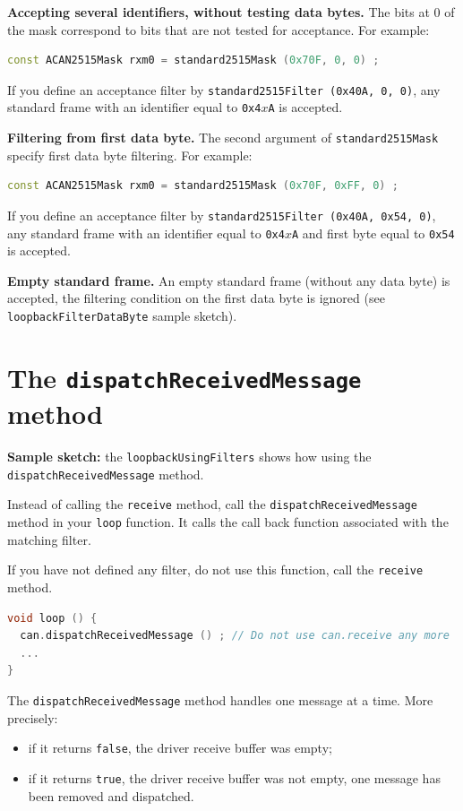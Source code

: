 \documentclass[10pt, a4paper, obeyspaces]{extarticle}
\newcommand \sectionLabel[2]{\section{#1}\label{sec:#2}}
\begin{document}
{\bf Accepting several identifiers, without testing data bytes.}
The bits at 0 of the mask correspond to bits that are not tested for acceptance. For example:
{ \small\begin{lstlisting}[language=c++]
  const ACAN2515Mask rxm0 = standard2515Mask (0x70F, 0, 0) ;
\end{lstlisting}}

If you define an acceptance filter by \texttt{standard2515Filter (0x40A, 0, 0)}, any standard frame with an identifier equal to \texttt{0x4$x$A} is accepted.




{\bf Filtering from first data byte.}
The second argument of \texttt{standard2515Mask} specify first data byte filtering. For example:
{ \small\begin{lstlisting}[language=c++]
  const ACAN2515Mask rxm0 = standard2515Mask (0x70F, 0xFF, 0) ;
\end{lstlisting}}

If you define an acceptance filter by \texttt{standard2515Filter (0x40A, 0x54, 0)}, any standard frame with an identifier equal to \texttt{0x4$x$A} and first byte equal to \texttt{0x54} is accepted.

{\bf Empty standard frame.} An empty standard frame (without any data byte) is accepted, the filtering condition on the first data byte is ignored (see \texttt{loopbackFilterDataByte} sample sketch).









\sectionLabel{The \texttt{dispatchReceivedMessage} method}{UsingDispatchMethod}

{\bf Sample sketch: } the \texttt{loopbackUsingFilters} shows how using the \texttt{dispatchReceivedMessage} method.

Instead of calling the \texttt{receive} method, call the \texttt{dispatchReceivedMessage} method in your \texttt{loop} function. It calls the call back function associated with the matching filter.

If you have not defined any filter, do not use this function, call the \texttt{receive} method.


{ \small\begin{lstlisting}[language=c++]
void loop () {
  can.dispatchReceivedMessage () ; // Do not use can.receive any more
  ...
}
\end{lstlisting}}

The \texttt{dispatchReceivedMessage} method handles one message at a time. More precisely:
\begin{itemize}
  \item if it returns \texttt{false}, the driver receive buffer was empty;
  \item if it returns \texttt{true}, the driver receive buffer was not empty, one message has been removed and dispatched.
\end{itemize}
\end{document}
